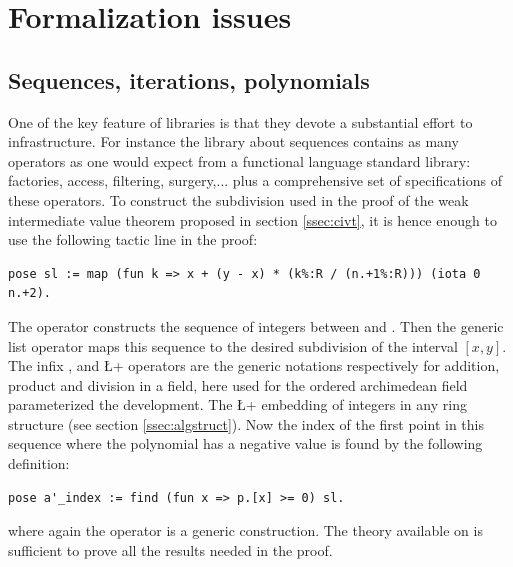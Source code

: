 \documentclass{mscs}
\begin{document}
\section{Formalization issues}
\label{sec:formal}

\subsection{Sequences, iterations, polynomials}\label{ssec:modularity}

One of the key feature of \ssr{} libraries is that they devote a
substantial effort to infrastructure. For instance the library about
sequences contains as many operators as one would expect from a
functional language standard library: factories, access, filtering,
surgery,... plus a comprehensive set of specifications of these
operators. To construct the subdivision used in the proof of the
weak intermediate value theorem proposed in section \ref{ssec:civt},
it is hence enough to use the following tactic line in the proof:
\begin{lstlisting}
pose sl := map (fun k => x + (y - x) * (k%:R / (n.+1%:R))) (iota 0 n.+2).
\end{lstlisting}
The  operator constructs the sequence of integers between
 and . Then the  generic list operator maps this
sequence to the desired subdivision of the interval $[x, y]$. The
infix \C{+}, \C{*} and \L+\+ operators are the generic notations
  respectively for addition, product and division in a field, here
  used for the ordered archimedean field parameterized the
  development. The \L+%
embedding of
integers in any ring structure (see section \ref{ssec:algstruct}).
Now the index of the first point in this sequence where the polynomial has a
negative value is found by the following definition:
\begin{lstlisting}
pose a'_index := find (fun x => p.[x] >= 0) sl.
\end{lstlisting}
where again the  operator is a generic construction. The
theory available on  is sufficient to prove all the results
needed in the proof.
\end{document}
